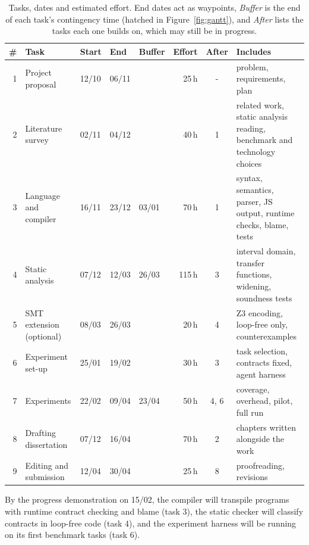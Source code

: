 \documentclass[11pt,a4paper,titlepage]{article}
\begin{document}
\begin{table}[H]
\centering
\small
\renewcommand{\arraystretch}{1.15}
\setlength{\tabcolsep}{4.5pt}
\begin{tabularx}{\textwidth}{@{}r >{\raggedright}p{2.9cm} l l l r c >{\raggedright\arraybackslash}X@{}}
\toprule
\# & Task & Start & End & Buffer & Effort & After & Includes \\
\midrule
1 & Project proposal         & 12/10 & 06/11 &       & 25\,h  & -   & problem, requirements, plan \\
2 & Literature survey        & 02/11 & 04/12 &       & 40\,h  & 1    & related work, static analysis reading, benchmark and technology choices \\
3 & Language and compiler    & 16/11 & 23/12 & 03/01 & 70\,h  & 1    & syntax, semantics, parser, JS output, runtime checks, blame, tests \\
4 & Static analysis          & 07/12 & 12/03 & 26/03 & 115\,h & 3    & interval domain, transfer functions, widening, soundness tests \\
5 & SMT extension (optional) & 08/03 & 26/03 &       & 20\,h  & 4    & Z3 encoding, loop-free only, counterexamples \\
6 & Experiment set-up        & 25/01 & 19/02 &       & 30\,h  & 3    & task selection, contracts fixed, agent harness \\
7 & Experiments              & 22/02 & 09/04 & 23/04 & 50\,h  & 4, 6 & coverage, overhead, pilot, full run \\
8 & Drafting dissertation    & 07/12 & 16/04 &       & 70\,h  & 2    & chapters written alongside the work \\
9 & Editing and submission   & 12/04 & 30/04 &       & 25\,h  & 8    & proofreading, revisions \\
\bottomrule
\end{tabularx}
\caption{Tasks, dates and estimated effort. End dates act as waypoints, \emph{Buffer} is the end of each task's contingency time (hatched in Figure~\ref{fig:gantt}), and \emph{After} lists the tasks each one builds on, which may still be in progress.}
\label{tab:tasks}
\end{table}

By the progress demonstration on 15/02, the compiler will transpile programs with runtime contract checking and blame (task 3), the static checker will classify contracts in loop-free code (task 4), and the experiment harness will be running on its first benchmark tasks (task 6).
\end{document}
